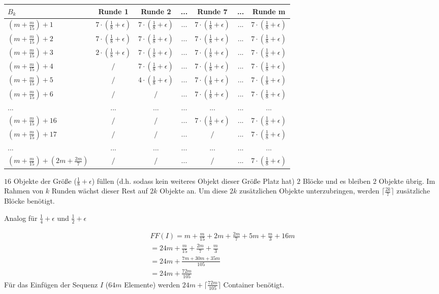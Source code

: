 \documentclass{article}
\begin{document}
\begin{center}
  \begin{tabular}{| l | c | c | c | c | c | c |  }
    \hline
    $B_{k}$ & Runde 1 & Runde 2 & ... & Runde 7 & ... & Runde m\\ \hline
    $(m+\frac{m}{15})+1$ & $7\cdot(\frac{1}{8}+\epsilon)$ & $7\cdot(\frac{1}{8}+\epsilon)$ & $...$ & $7\cdot(\frac{1}{8}+\epsilon)$ & $...$ & $7\cdot(\frac{1}{8}+\epsilon)$ \\ \hline
    $(m+\frac{m}{15})+2$ & $7\cdot(\frac{1}{8}+\epsilon)$ & $7\cdot(\frac{1}{8}+\epsilon)$ & $...$ & $7\cdot(\frac{1}{8}+\epsilon)$ & $...$ & $7\cdot(\frac{1}{8}+\epsilon)$  \\ \hline
    $(m+\frac{m}{15})+3$ & $2\cdot(\frac{1}{8}+\epsilon)$ & $7\cdot(\frac{1}{8}+\epsilon)$ & $...$ & $7\cdot(\frac{1}{8}+\epsilon)$ & $...$ & $7\cdot(\frac{1}{8}+\epsilon)$  \\ \hline
    $(m+\frac{m}{15})+4$ & $/$ & $7\cdot(\frac{1}{8}+\epsilon)$ & $...$ & $7\cdot(\frac{1}{8}+\epsilon)$ & $...$ & $7\cdot(\frac{1}{8}+\epsilon)$  \\ \hline
    $(m+\frac{m}{15})+5$ & $/$ & $4\cdot(\frac{1}{8}+\epsilon)$ & $...$ & $7\cdot(\frac{1}{8}+\epsilon)$ & $...$ & $7\cdot(\frac{1}{8}+\epsilon)$  \\ \hline
 	$(m+\frac{m}{15})+6$ & $/$ & $/$ & $...$ & $7\cdot(\frac{1}{8}+\epsilon)$ & $...$ & $7\cdot(\frac{1}{8}+\epsilon)$  \\ \hline
    $...$  & $...$ & $...$ & $...$ & $...$ & $...$ & $...$  \\ \hline
    $(m+\frac{m}{15})+16$ & $/$ & $/$ & $...$ & $7\cdot(\frac{1}{8}+\epsilon)$ & $...$ & $7\cdot(\frac{1}{8}+\epsilon)$ \\ \hline
      $(m+\frac{m}{15})+17$ & $/$ & $/$ & $...$ & $/$ & $...$ & $7\cdot(\frac{1}{8}+\epsilon)$ \\ \hline
    $...$ & $...$ & $...$ & $...$ & $...$ & $...$ & $...$  \\ \hline
    $(m+\frac{m}{15})+(2m+\frac{2m}{7})$ & $/$ & $/$ & $...$ & $/$ & $...$ & $7\cdot(\frac{1}{8}+\epsilon)$  \\ \hline
    \hline
  \end{tabular}
\end{center}

$16$ Objekte der Größe ($\frac{1}{8}+\epsilon$) füllen (d.h. sodass kein weiteres Objekt dieser Größe Platz hat)  $2$ Blöcke und es bleiben $2$ Objekte übrig. Im Rahmen von $k$ Runden wächst dieser Rest auf $2k$ Objekte an. Um diese $2k$ zusätzlichen Objekte unterzubringen, werden $\lceil\frac{2k}{7}\rceil$ zusätzliche Blöcke benötigt.

Analog für $\frac{1}{4}+\epsilon$ und $\frac{1}{2}+\epsilon$

\begin{align*}
FF(I)=m+\frac{m}{15}+2m+\frac{2m}{7}+5m+\frac{m}{3}+16m\\
=24m+\frac{m}{15}+\frac{2m}{7}+\frac{m}{3}\\
=24m+\frac{7m+30m+35m}{105}\\
=24m+\frac{72m}{105}
\end{align*}
Für das Einfügen der Sequenz $I$ ($64m$ Elemente) werden $24m+\lceil\frac{72m}{105}\rceil$ Container benötigt.
\end{document}
